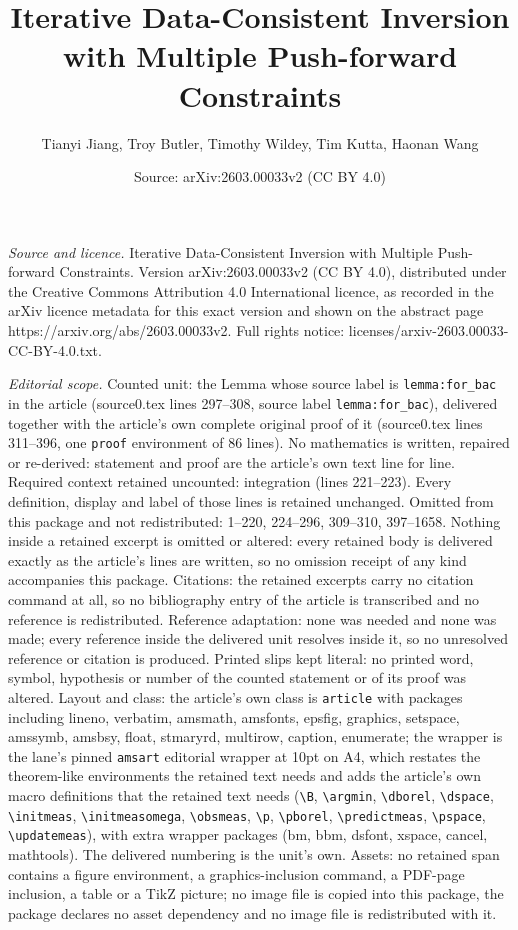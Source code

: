 \documentclass[10pt,a4paper]{amsart}
\title[Iterative Data-Consistent Inversion with Multiple Push-forwa]{Iterative Data-Consistent Inversion with Multiple Push-forward Constraints}
\author{Tianyi Jiang, Troy Butler, Timothy Wildey, Tim Kutta, Haonan Wang}
\date{Source: arXiv:2603.00033v2 (CC BY 4.0)}
\begin{document}
\maketitle

\noindent\emph{Source and licence.} Iterative Data-Consistent Inversion with Multiple Push-forward Constraints. Version arXiv:2603.00033v2 (CC BY 4.0), distributed under the Creative Commons Attribution 4.0 International licence, as recorded in the arXiv licence metadata for this exact version and shown on the abstract page https://arxiv.org/abs/2603.00033v2. Full rights notice: licenses/arxiv-2603.00033-CC-BY-4.0.txt.\par\smallskip

\noindent\textit{Editorial scope.} Counted unit: the Lemma whose source label is \texttt{lemma:for\_bac} in the article (source0.tex lines 297--308, source label \texttt{lemma:for\_bac}), delivered together with the article's own complete original proof of it (source0.tex lines 311--396, one \texttt{proof} environment of 86 lines). No mathematics is written, repaired or re-derived: statement and proof are the article's own text line for line. Required context retained uncounted: integration (lines 221--223). Every definition, display and label of those lines is retained unchanged. Omitted from this package and not redistributed: 1--220, 224--296, 309--310, 397--1658. Nothing inside a retained excerpt is omitted or altered: every retained body is delivered exactly as the article's lines are written, so no omission receipt of any kind accompanies this package. Citations: the retained excerpts carry no citation command at all, so no bibliography entry of the article is transcribed and no reference is redistributed. Reference adaptation: none was needed and none was made; every reference inside the delivered unit resolves inside it, so no unresolved reference or citation is produced. Printed slips kept literal: no printed word, symbol, hypothesis or number of the counted statement or of its proof was altered. Layout and class: the article's own class is \texttt{article} with packages including lineno, verbatim, amsmath, amsfonts, epsfig, graphics, setspace, amssymb, amsbsy, float, stmaryrd, multirow, caption, enumerate; the wrapper is the lane's pinned \texttt{amsart} editorial wrapper at 10pt on A4, which restates the theorem-like environments the retained text needs and adds the article's own macro definitions that the retained text needs (\texttt{\textbackslash B}, \texttt{\textbackslash argmin}, \texttt{\textbackslash dborel}, \texttt{\textbackslash dspace}, \texttt{\textbackslash initmeas}, \texttt{\textbackslash initmeasomega}, \texttt{\textbackslash obsmeas}, \texttt{\textbackslash p}, \texttt{\textbackslash pborel}, \texttt{\textbackslash predictmeas}, \texttt{\textbackslash pspace}, \texttt{\textbackslash updatemeas}), with extra wrapper packages (bm, bbm, dsfont, xspace, cancel, mathtools). The delivered numbering is the unit's own. Assets: no retained span contains a figure environment, a graphics-inclusion command, a PDF-page inclusion, a table or a TikZ picture; no image file is copied into this package, the package declares no asset dependency and no image file is redistributed with it. 
\end{document}
